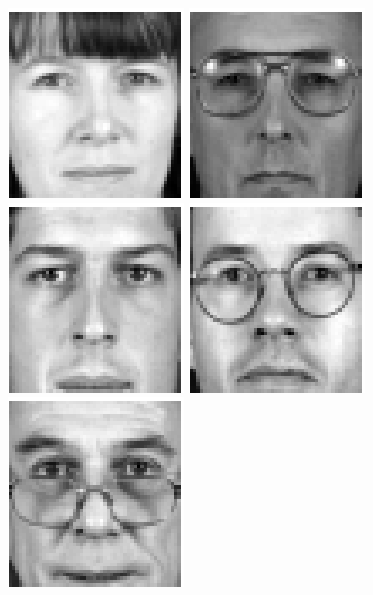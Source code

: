 \begin{figure}
\begin{center}
\includegraphics[scale=0.12]{ch4/figures/XM2VTS_51.png}
\includegraphics[scale=0.12]{ch4/figures/XM2VTS_52.png}
\includegraphics[scale=0.12]{ch4/figures/XM2VTS_53.png}
\includegraphics[scale=0.12]{ch4/figures/XM2VTS_54.png}
\includegraphics[scale=0.12]{ch4/figures/XM2VTS_55.png}

\end{center}
\end{figure}
